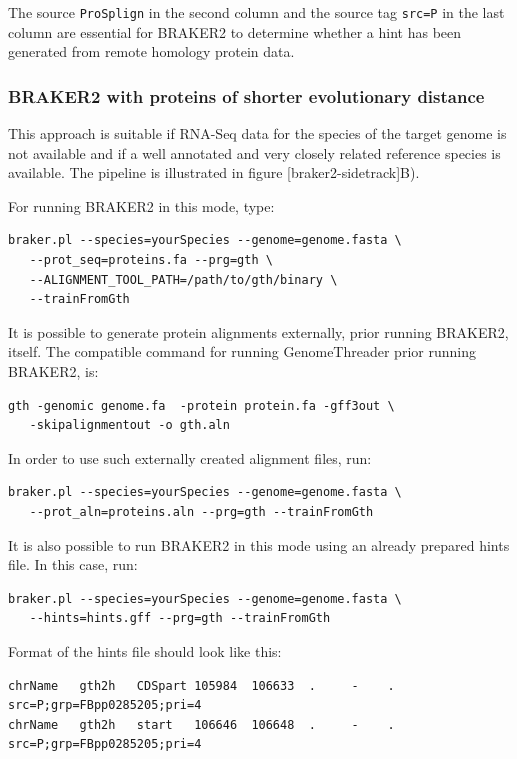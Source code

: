\documentclass[]{article}
\begin{document}
The source \texttt{ProSplign} in the second column and the source tag
\texttt{src=P} in the last column are essential for BRAKER2 to determine
whether a hint has been generated from remote homology protein data.

\hypertarget{prot-in}{\subsubsection{BRAKER2 with proteins of shorter
evolutionary distance}\label{prot-in}}

This approach is suitable if RNA-Seq data for the species of the target
genome is not available and if a well annotated and very closely related
reference species is available. The pipeline is illustrated in figure
{[}braker2-sidetrack{]}B).

For running BRAKER2 in this mode, type:

\begin{verbatim}
braker.pl --species=yourSpecies --genome=genome.fasta \
   --prot_seq=proteins.fa --prg=gth \
   --ALIGNMENT_TOOL_PATH=/path/to/gth/binary \
   --trainFromGth
\end{verbatim}

It is possible to generate protein alignments externally, prior running
BRAKER2, itself. The compatible command for running GenomeThreader prior
running BRAKER2, is:

\begin{verbatim}
gth -genomic genome.fa  -protein protein.fa -gff3out \
   -skipalignmentout -o gth.aln
\end{verbatim}

In order to use such externally created alignment files, run:

\begin{verbatim}
braker.pl --species=yourSpecies --genome=genome.fasta \
   --prot_aln=proteins.aln --prg=gth --trainFromGth
\end{verbatim}

It is also possible to run BRAKER2 in this mode using an already
prepared hints file. In this case, run:

\begin{verbatim}
braker.pl --species=yourSpecies --genome=genome.fasta \
   --hints=hints.gff --prg=gth --trainFromGth
\end{verbatim}

Format of the hints file should look like this:

\begin{verbatim}
chrName   gth2h   CDSpart 105984  106633  .     -    .    src=P;grp=FBpp0285205;pri=4
chrName   gth2h   start   106646  106648  .     -    .    src=P;grp=FBpp0285205;pri=4
\end{verbatim}
\end{document}
